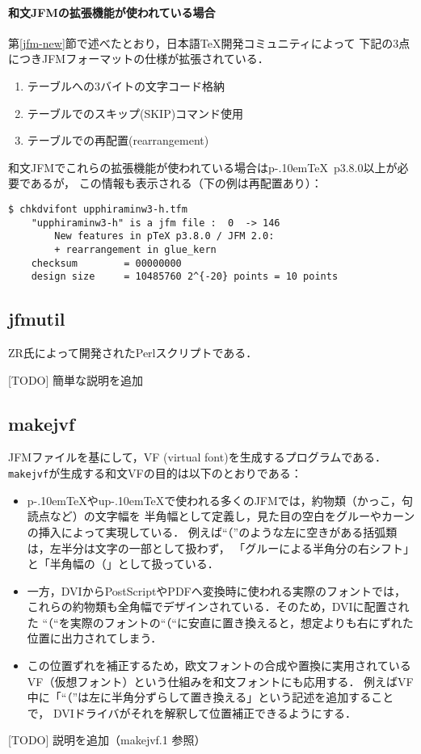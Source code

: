 \documentclass[a4paper,11pt,nomag]{jsarticle}
\def\code#1{\texttt{#1}}
\def\pTeX{p\kern-.10em\TeX}\def\upTeX{u\pTeX}
\begin{document}
\paragraph{和文JFMの拡張機能が使われている場合}
第\ref{jfm-new}節で述べたとおり，日本語\TeX 開発コミュニティによって
下記の3点につきJFMフォーマットの仕様が拡張されている．
\begin{enumerate}
  \item {}テーブルへの3バイトの文字コード格納
  \item {}テーブルでのスキップ(SKIP)コマンド使用
  \item {}テーブルでの再配置(rearrangement)
\end{enumerate}
和文JFMでこれらの拡張機能が使われている場合は\pTeX~p3.8.0以上が必要であるが，
この情報も表示される（下の例は再配置あり）：
\begin{verbatim}
$ chkdvifont upphiraminw3-h.tfm
    "upphiraminw3-h" is a jfm file :  0  -> 146
        New features in pTeX p3.8.0 / JFM 2.0:
        + rearrangement in glue_kern
    checksum        = 00000000
    design size     = 10485760 2^{-20} points = 10 points
\end{verbatim}

\subsection{jfmutil}

ZR氏によって開発されたPerlスクリプトである．

[TODO] 簡単な説明を追加

\subsection{makejvf}

JFMファイルを基にして，VF (virtual font)を生成するプログラムである．
\code{makejvf}が生成する和文VFの目的は以下のとおりである：
\begin{itemize}
  \item \pTeX や\upTeX で使われる多くのJFMでは，約物類（かっこ，句読点など）の文字幅を
    半角幅として定義し，見た目の空白をグルーやカーンの挿入によって実現している．
    例えば``（''のような左に空きがある括弧類は，左半分は文字の一部として扱わず，
    「グルーによる半角分の右シフト」と「半角幅の\inhibitglue （」として扱っている．
  \item 一方，DVIからPostScriptやPDFへ変換時に使われる実際のフォントでは，
    これらの約物類も全角幅でデザインされている．そのため，DVIに配置された
    ``（``を実際のフォントの``（``に安直に置き換えると，想定よりも右にずれた
    位置に出力されてしまう．
  \item この位置ずれを補正するため，欧文フォントの合成や置換に実用されている
    VF（仮想フォント）という仕組みを和文フォントにも応用する．
    例えばVF中に「``（''は左に半角分ずらして置き換える」という記述を追加することで，
    DVIドライバがそれを解釈して位置補正できるようにする．
\end{itemize}

[TODO] 説明を追加（makejvf.1 参照）
\end{document}

